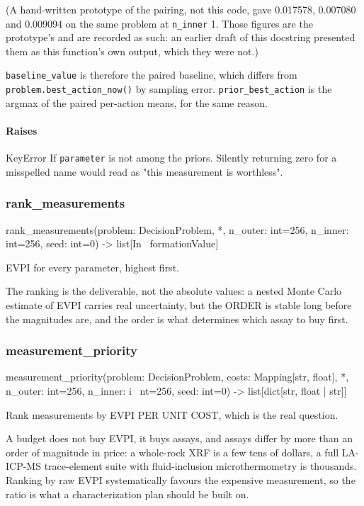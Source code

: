 \documentclass[10pt,a4paper,twoside]{report}
\begin{document}
(A hand-written prototype of the pairing, not this code, gave 0.017578, 0.007080 and 0.009094 on the same problem at \texttt{n\_inner} 1. Those figures are the prototype's and are recorded as such: an earlier draft of this docstring presented them as this function's own output, which they were not.)

\texttt{baseline\_value} is therefore the paired baseline, which differs from \texttt{problem.best\_action\_now()} by sampling error. \texttt{prior\_best\_action} is the argmax of the paired per-action means, for the same reason.

\paragraph*{Raises}

KeyError If \texttt{parameter} is not among the priors. Silently returning zero for a misspelled name would read as "this measurement is worthless".

\subsubsection*{rank\_measurements}

\begin{verbatimsmall}
rank_measurements(problem: DecisionProblem, *, n_outer: int=256, n_inner: int=256, seed: int=0) -> list[In
    \ formationValue]
\end{verbatimsmall}

EVPI for every parameter, highest first.

The ranking is the deliverable, not the absolute values: a nested Monte Carlo estimate of EVPI carries real uncertainty, but the ORDER is stable long before the magnitudes are, and the order is what determines which assay to buy first.

\subsubsection*{measurement\_priority}

\begin{verbatimsmall}
measurement_priority(problem: DecisionProblem, costs: Mapping[str, float], *, n_outer: int=256, n_inner: i
    \ nt=256, seed: int=0) -> list[dict[str, float | str]]
\end{verbatimsmall}

Rank measurements by EVPI PER UNIT COST, which is the real question.

A budget does not buy EVPI, it buys assays, and assays differ by more than an order of magnitude in price: a whole-rock XRF is a few tens of dollars, a full LA-ICP-MS trace-element suite with fluid-inclusion microthermometry is thousands. Ranking by raw EVPI systematically favours the expensive measurement, so the ratio is what a characterization plan should be built on.
\end{document}
